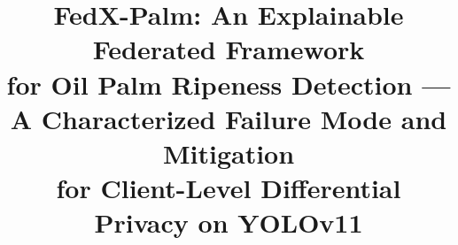 \documentclass[conference]{IEEEtran}
\begin{document}
\title{FedX-Palm: An Explainable Federated Framework\\
for Oil Palm Ripeness Detection ---\\
A Characterized Failure Mode and Mitigation\\
for Client-Level Differential Privacy on YOLOv11}

\author{
\and
{}
}

\maketitle
\end{document}
